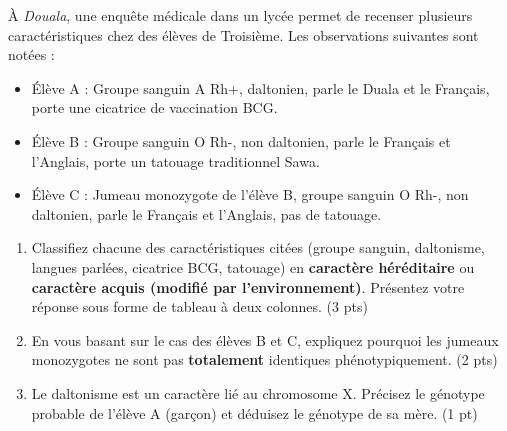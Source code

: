 \documentclass[11pt]{article}
\begin{document}
\begin{exercice}
À \textit{Douala}, une enquête médicale dans un lycée permet de recenser plusieurs caractéristiques chez des élèves de Troisième. Les observations suivantes sont notées :
\begin{itemize}
    \item Élève A : Groupe sanguin A Rh+, daltonien, parle le Duala et le Français, porte une cicatrice de vaccination BCG.
    \item Élève B : Groupe sanguin O Rh-, non daltonien, parle le Français et l'Anglais, porte un tatouage traditionnel Sawa.
    \item Élève C : Jumeau monozygote de l'élève B, groupe sanguin O Rh-, non daltonien, parle le Français et l'Anglais, pas de tatouage.
\end{itemize}

\begin{enumerate}
    \item Classifiez chacune des caractéristiques citées (groupe sanguin, daltonisme, langues parlées, cicatrice BCG, tatouage) en \textbf{caractère héréditaire} ou \textbf{caractère acquis (modifié par l'environnement)}. Présentez votre réponse sous forme de tableau à deux colonnes. (3 pts)
    \item En vous basant sur le cas des élèves B et C, expliquez pourquoi les jumeaux monozygotes ne sont pas \textbf{totalement} identiques phénotypiquement. (2 pts)
    \item Le daltonisme est un caractère lié au chromosome X. Précisez le génotype probable de l'élève A (garçon) et déduisez le génotype de sa mère. (1 pt)
\end{enumerate}
\end{exercice}
\end{document}
